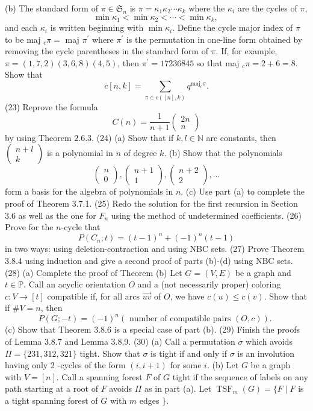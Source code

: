 \documentclass[a4paper,12pt]{ctexbook}
\begin{document}
(b) The standard form of $\pi \in \mathfrak{S}_{n}$ is $\pi=\kappa_{1} \kappa_{2} \cdots \kappa_{k}$ where the $\kappa_{i}$ are the cycles of $\pi$,
$$
\min \kappa_{1}<\min \kappa_{2}<\cdots<\min \kappa_{k} \text {, }
$$
and each $\kappa_{i}$ is written beginning with $\min \kappa_{i}$. Define the cycle major index of $\pi$ to be maj ${ }_{c} \pi=$ maj $\pi^{\prime}$ where $\pi^{\prime}$ is the permutation in one-line form obtained by removing the cycle parentheses in the standard form of $\pi$. If, for example, $\pi=(1,7,2)(3,6,8)(4,5)$, then $\pi^{\prime}=17236845$ so that maj $_{c} \pi=2+6=8$. Show that
$$
c[n, k]=\sum_{\pi \in c([n], k)} q^{\mathrm{maj}_{\mathrm{c}} \pi} .
$$
(23) Reprove the formula
$$
C(n)=\frac{1}{n+1}\left(\begin{array}{c}
2 n \\
n
\end{array}\right)
$$
by using Theorem $2.6 .3$.
(24) (a) Show that if $k, l \in \mathbb{N}$ are constants, then $\left(\begin{array}{c}n+l \\ k\end{array}\right)$ is a polynomial in $n$ of degree $k$.
(b) Show that the polynomials
$$
\left(\begin{array}{l}
n \\
0
\end{array}\right),\left(\begin{array}{c}
n+1 \\
1
\end{array}\right),\left(\begin{array}{c}
n+2 \\
2
\end{array}\right), \ldots
$$
form a basis for the algebra of polynomials in $n$.
(c) Use part (a) to complete the proof of Theorem 3.7.1.
(25) Redo the solution for the first recursion in Section $3.6$ as well as the one for $F_{n}$ using the method of undetermined coefficients.
(26) Prove for the $n$-cycle that
$$
P\left(C_{n} ; t\right)=(t-1)^{n}+(-1)^{n}(t-1)
$$
in two ways: using deletion-contraction and using NBC sets.
(27) Prove Theorem 3.8.4 using induction and give a second proof of parts (b)-(d) using NBC sets.
(28) (a) Complete the proof of Theorem
(b) Let $G=(V, E)$ be a graph and $t \in \mathbb{P}$. Call an acyclic orientation $O$ and a (not necessarily proper) coloring $c: V \rightarrow[t]$ compatible if, for all arcs $\overrightarrow{u v}$ of $O$, we have $c(u) \leq c(v)$. Show that if $\# V=n$, then
$$
P(G ;-t)=(-1)^{n}(\text { number of compatible pairs }(O, c)) \text {. }
$$
(c) Show that Theorem $3.8 .6$ is a special case of part (b).
(29) Finish the proofs of Lemma $3.8 .7$ and Lemma 3.8.9.
(30) (a) Call a permutation $\sigma$ which avoids $\Pi=\{231,312,321\}$ tight. Show that $\sigma$ is tight if and only if $\sigma$ is an involution having only 2 -cycles of the form $(i, i+1)$ for some $i$.
(b) Let $G$ be a graph with $V=[n]$. Call a spanning forest $F$ of $G$ tight if the sequence of labels on any path starting at a root of $F$ avoids $\Pi$ as in part (a). Let
$\operatorname{TSF}_{m}(G)=\{F \mid F$ is a tight spanning forest of $G$ with $m$ edges $\} .$
\end{document}
